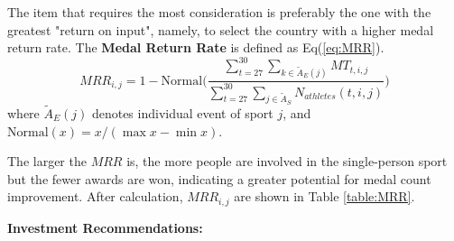 \documentclass{mcmthesis}
\begin{document}


The item that requires the most consideration is preferably the one with the greatest "return on input", namely, to select the country with a higher medal return rate. The \textbf{Medal Return Rate} is defined as Eq(\ref{eq:MRR}).
\begin{equation}
	MRR_{i,j}=1-\text{Normal}
	\Bigg( 
	\frac{ \sum_{t=27}^{30} \sum_{k\in \tilde{A}_{E}(j)} MT_{t,i,j} }{ \sum_{t=27}^{30} \sum_{j\in \tilde{A}_{S}} N_{athletes}(t,i,j) }
	\Bigg)
	\label{eq:MRR}
\end{equation}
where $\tilde{A}_{E}(j)$ denotes individual event of sport $j$, and $\text{Normal}(x)=x/(\max{x} - \min{x})$. 

The larger the $MRR$ is, the more people are involved in the single-person sport but the fewer awards are won, indicating a greater potential for medal count improvement. After calculation, $MRR_{i,j}$ are shown in Table \ref{table:MRR}.
\begin{table}[htbp]
	\centering
	\caption{Medal Rate Ranking for Different Countries}
	\label{table:MRR}
\end{table}
\textbf{Investment Recommendations:}
\end{document}
